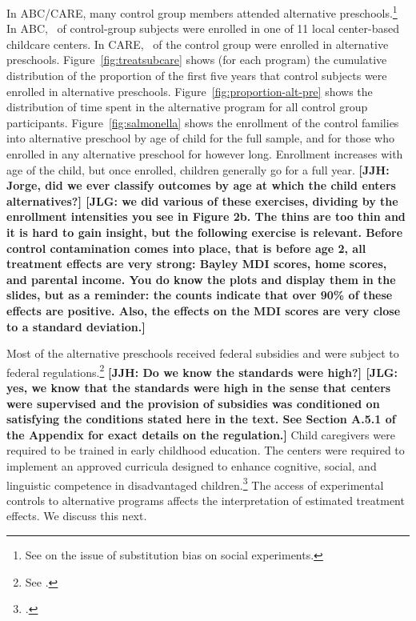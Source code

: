 In ABC/CARE, many control group members attended alternative preschools.\footnote{See \cite{Heckman_Hohmann_etal_2000_QJE} on the issue of substitution bias on social experiments.} In ABC, \treatsubsabc\ of control-group subjects were enrolled in one of 11 local center-based childcare centers. In CARE, \treatsubscarec\ of the control group were enrolled in alternative preschools. Figure~\ref{fig:treatsubcare} shows (for each program) the cumulative distribution of the proportion of the first five years that control subjects were enrolled in alternative preschools. Figure~\ref{fig:proportion-alt-pre} shows the distribution of time spent in the alternative program for all control group participants. Figure~\ref{fig:salmonella} shows the enrollment of the control families into alternative preschool by age of child for the full sample, and for those who enrolled in any alternative preschool for however long. Enrollment increases with age of the child, but once enrolled, children generally go for a full year. \textbf{[JJH: Jorge, did we ever classify outcomes by age at which the child enters alternatives?] [JLG: we did various of these exercises, dividing by the enrollment intensities you see in Figure 2b. The thins are too thin and it is hard to gain insight, but the following exercise is relevant. Before control contamination comes into place, that is before age 2, all treatment effects are very strong: Bayley MDI scores, home scores, and parental income. You do know the plots and display them in the slides, but as a reminder: the counts indicate that over 90\% of these effects are positive. Also, the effects on the MDI scores are very close to a standard deviation.]}

Most of the alternative preschools received federal subsidies and were subject to federal regulations.\footnote{See \citet{Department-of-Health_1968_DayCareRequirements,NCGA_1971_House-Bill-100,Ramey-et-al_1977_Intro-to-ABC,Ramey_Campbell_1979_SR,Ramey_McGinness_etal_1982_Abecedarianapproach, Burchinal_Campbell_etal_1997_CD}.} \textbf{[JJH: Do we know the standards were high?] [JLG: yes, we know that the standards were high in the sense that centers were supervised and the provision of subsidies was conditioned on satisfying the conditions stated here in the text. See Section A.5.1 of the Appendix for exact details on the regulation.]} Child caregivers were required to be trained in early childhood education. The centers were required to implement an approved curricula designed to enhance cognitive, social, and linguistic competence in disadvantaged children.\footnote{\citet{Burchinal_etal_1989_CD_Daycare-Pre-K-Dev}.} The access of experimental controls to alternative programs affects the interpretation of estimated treatment effects. We discuss this next.

